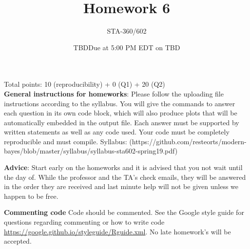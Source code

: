 \documentclass{article}
\begin{document}
\title{Homework 6}
\author{STA-360/602}
\date{TBD}
\date{Due at 5:00 PM EDT on TBD}
\maketitle

Total points: 10 (reproducibility) + 0 (Q1) + 20 (Q2)\\

\textbf{General instructions for homeworks}: Please follow the uploading file instructions according to the syllabus. You will give the commands to answer each question in its own code block, which will also produce plots that will be automatically embedded in the output file. Each answer must be supported by written statements as well as any code used. Your code must be completely reproducible and must compile. Syllabus: (https://github.com/resteorts/modern-bayes/blob/master/syllabus/syllabus-sta602-spring19.pdf)

\textbf{Advice}: Start early on the homeworks and it is advised that you not wait until the day of. While the professor and the TA's check emails, they will be answered in the order they are received and last minute help will not be given unless we happen to be free.  

\textbf{Commenting code}
Code should be commented. See the Google style guide for questions regarding commenting or how to write 
code \url{https://google.github.io/styleguide/Rguide.xml}. No late homework's will be accepted.
\end{document}
